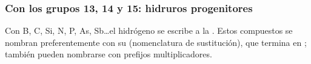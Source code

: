 \documentclass[12pt]{article}
\theoremstyle{mygreennumbox}
\newcommand{\mal}[1]{\textcolor{red}{\sout{#1}}}
\begin{document}
\subsubsection{Con los grupos 13, 14 y 15: hidruros progenitores}

Con B, C, Si, N, P, As, Sb\dots el hidrógeno se escribe a la . Estos compuestos se nombran preferentemente con su  (nomenclatura de sustitución), que termina en ; también pueden nombrarse con prefijos multiplicadores.

\end{document}
